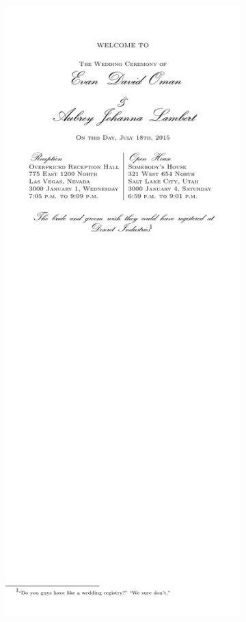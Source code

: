 \documentclass[12pt]{article}
\begin{document}
\begin{figure}[h]
\begin{subfigure}[b]{0.4\textwidth}
			\includegraphics[width=.5\textwidth]{program}
	\end{subfigure}%
\end{figure}
\end{document}
